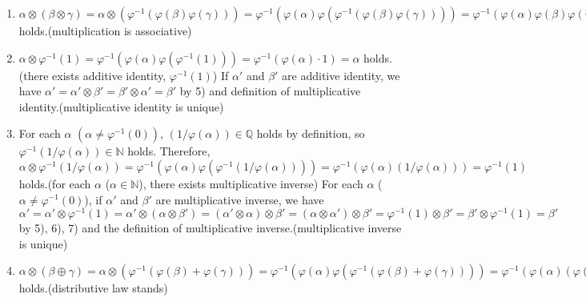 \documentclass{article}
\begin{document}
\begin{enumerate}[label = (\alph*)]
\begin{enumerate}[label = \alph*)]
         \item $\alpha \otimes (\beta \otimes \gamma) = \alpha \otimes (\varphi^{-1}(\varphi(\beta)\varphi(\gamma))) = \varphi^{-1}(\varphi(\alpha)\varphi(\varphi^{-1}(\varphi(\beta)\varphi(\gamma)))) = \varphi^{-1}(\varphi(\alpha)\varphi(\beta)\varphi(\gamma)) = \varphi^{-1}(\varphi(\varphi^{-1}(\varphi(\alpha)\varphi(\beta)))\varphi(\gamma)) = \varphi^{-1}(\varphi(\alpha)\varphi(\beta)) \otimes \gamma = (\alpha \otimes \beta) \otimes \gamma$ holds.(multiplication is associative)
         \item $\alpha \otimes \varphi^{-1}(1) = \varphi^{-1}(\varphi(\alpha)\varphi(\varphi^{-1}(1))) = \varphi^{-1}(\varphi(\alpha)\cdot1) = \alpha$ holds.(there exists additive identity, $\varphi^{-1}(1)$)
  If $\alpha'$ and $\beta'$ are additive identity, we have $\alpha' = \alpha' \otimes \beta' = \beta' \otimes \alpha' = \beta'$ by 5) and definition of multiplicative identity.(multiplicative identity is unique)
         \item For each $\alpha$ $(\alpha \neq \varphi^{-1}(0))$, $(1/\varphi(\alpha))\in\mathbb{Q}$ holds by definition, so $\varphi^{-1}(1/\varphi(\alpha)) \in \mathbb{N}$ holds. Therefore, $\alpha \otimes \varphi^{-1}(1/\varphi(\alpha)) = \varphi^{-1}(\varphi(\alpha)\varphi(\varphi^{-1}(1/\varphi(\alpha)))) = \varphi^{-1}(\varphi(\alpha)(1/\varphi(\alpha))) = \varphi^{-1}(1)$ holds.(for each $\alpha$ ($\alpha \in \mathbb{N}$), there exists multiplicative inverse)
  For each $\alpha$ ($\alpha \neq \varphi^{-1}(0)$), if $\alpha'$ and $\beta'$ are multiplicative inverse, we have $\alpha' = \alpha' \otimes \varphi^{-1}(1) = \alpha' \otimes (\alpha \otimes \beta') = (\alpha' \otimes \alpha) \otimes \beta' = (\alpha \otimes \alpha') \otimes \beta' = \varphi^{-1}(1) \otimes \beta' = \beta' \otimes \varphi^{-1}(1) = \beta'$ by 5), 6), 7) and the definition of multiplicative inverse.(multiplicative inverse is unique) 
         \item $\alpha \otimes (\beta \oplus \gamma) = \alpha \otimes (\varphi^{-1}(\varphi(\beta) + \varphi(\gamma))) = \varphi^{-1}(\varphi(\alpha)\varphi(\varphi^{-1}(\varphi(\beta) + \varphi(\gamma)))) = \varphi^{-1}(\varphi(\alpha)(\varphi(\beta) + \varphi(\gamma))) = \varphi^{-1}(\varphi(\alpha)\varphi(\beta) + \varphi(\alpha)\varphi(\gamma)) = \varphi^{-1}(\varphi(\varphi^{-1}(\varphi(\alpha)\varphi(\beta))) + \varphi(\varphi^{-1}(\varphi(\alpha)\varphi(\gamma)))) = \varphi^{-1}(\varphi(\alpha \otimes \beta) + \varphi(\alpha \otimes \gamma)) = \alpha \otimes \beta \oplus \alpha \otimes \gamma$ holds.(distributive law stands)
\end{enumerate}
\end{enumerate}
\end{document}
